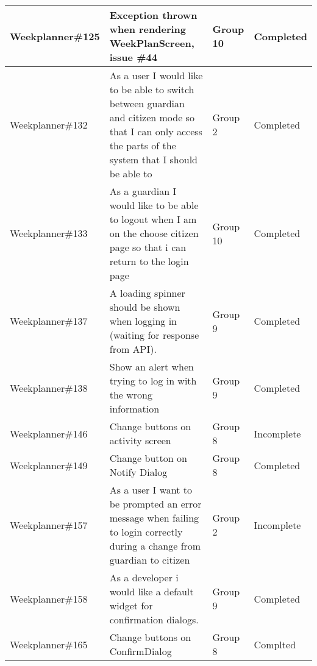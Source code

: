 \begin{longtable}{|p{2.9cm}|p{8cm}|p{2cm}|p{2cm}|}
    Weekplanner\#125 & Exception thrown when rendering WeekPlanScreen, issue \#44                                                                                                                             & Group 10      & Completed   \\ \hline
    Weekplanner\#132 & As a user I would like to be able to switch between guardian and citizen mode so that I can only access the parts of the system that I should be able to                            & Group 2          & Completed    \\ \hline
    Weekplanner\#133 & As a guardian I would like to be able to logout when I am on the choose citizen page so that i can return to the login page                                                              & Group 10    & Completed    \\ \hline
    Weekplanner\#137 & A loading spinner should be shown when logging in (waiting for response from API).                                                                                                    & Group 9        & Completed     \\ \hline
    Weekplanner\#138 & Show an alert when trying to log in with the wrong information                                                                                                                         & Group 9       & Completed    \\ \hline
    Weekplanner\#146 & Change buttons on activity screen                                                                                                                                                    & Group 8         & Incomplete    \\ \hline
    Weekplanner\#149 & Change button on Notify Dialog                                                                                                                                                        & Group 8        & Completed    \\ \hline
    Weekplanner\#157 & As a user I want to be prompted an error message when failing to login correctly during a change from guardian to citizen                                                             & Group 2        & Incomplete    \\ \hline
    Weekplanner\#158 & As a developer i would like a default widget for confirmation dialogs.                                                                                                                  & Group 9      & Completed    \\ \hline
    Weekplanner\#165 & Change buttons on ConfirmDialog                                                                                                                                                        & Group 8       & Complted    \\ \hline

\end{longtable}
